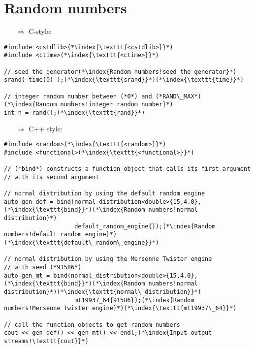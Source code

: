 \documentclass[10pt]{article}
\begin{document}
\section{Random numbers}
\small
\begin{enumerate}
\item[$\Rightarrow$] C-style:
\end{enumerate}
\begin{lstlisting}
#include <cstdlib>(*\index{\texttt{<cstdlib>}}*)
#include <ctime>(*\index{\texttt{<ctime>}}*)

// seed the generator(*\index{Random numbers!seed the generator}*)
srand( time(0) );(*\index{\texttt{srand}}*)(*\index{\texttt{time}}*)

// integer random number between (*0*) and (*RAND\_MAX*)(*\index{Random numbers!integer random number}*)
int n = rand();(*\index{\texttt{rand}}*)
\end{lstlisting}
\begin{enumerate}
\item[$\Rightarrow$] C++ style:
\end{enumerate}
\begin{lstlisting}
#include <random>(*\index{\texttt{<random>}}*)
#include <functional>(*\index{\texttt{<functional>}}*)

// (*bind*) constructs a function object that calls its first argument
// with its second argument

// normal distribution by using the default random engine
auto gen_def = bind(normal_distribution<double>{15,4.0},(*\index{\texttt{bind}}*)(*\index{Random numbers!normal distribution}*)
                    default_random_engine{});(*\index{Random numbers!default random engine}*)(*\index{\texttt{default\_random\_engine}}*)
                    
// normal distribution by using the Mersenne Twister engine
// with seed (*91586*)                  
auto gen_mt = bind(normal_distribution<double>{15,4.0},(*\index{\texttt{bind}}*)(*\index{Random numbers!normal distribution}*)(*\index{\texttt{normal\_distribution}}*)
                    mt19937_64{91586});(*\index{Random numbers!Mersenne Twister engine}*)(*\index{\texttt{mt19937\_64}}*)

// call the function objects to get random numbers
cout << gen_def() << gen_mt() << endl;(*\index{Input-output streams!\texttt{cout}}*)
\end{lstlisting}
%
%
\end{document}

